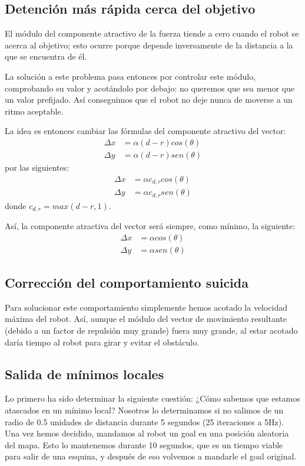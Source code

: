 \documentclass[a4paper, 11pt, titlepage]{article}
\begin{document}
  \subsection{Detención más rápida cerca del objetivo}
    El módulo del componente atractivo de la fuerza tiende a cero cuando el robot se acerca al objetivo; esto ocurre porque depende inversamente de la distancia a la que se encuentra de él.

    La solución a este problema pasa entonces por controlar este módulo, comprobando su valor y acotándolo por debajo: no queremos que sea menor que un valor prefijado. Así conseguimos que el robot no deje nunca de moverse a un ritmo aceptable.

    La idea es entonces cambiar las fórmulas del componente atractivo del vector:
    \begin{align*}
        \Delta x &= \alpha (d-r) cos(\theta) \\
        \Delta y &= \alpha (d-r) sen(\theta)
    \end{align*}
    por las siguientes:
    \begin{align*}
        \Delta x &= \alpha c_{d,r} cos(\theta) \\
        \Delta y &= \alpha c_{d,r} sen(\theta)
    \end{align*}
    donde $c_{d,r} = max(d-r, 1)$.

    Así, la componente atractiva del vector será siempre, como mínimo, la siguiente:
    \begin{align*}
        \Delta x &= \alpha cos(\theta) \\
        \Delta y &= \alpha sen(\theta)
    \end{align*}


  \subsection{Corrección del comportamiento suicida}
    Para solucionar este comportamiento simplemente hemos acotado la velocidad máxima del robot. Así, aunque el módulo del vector de movimiento resultante (debido a un factor de repulsión muy grande) fuera muy grande, al estar acotado daría tiempo al robot para girar y evitar el obstáculo.

  \subsection{Salida de mínimos locales}
    Lo primero ha sido determinar la siguiente cuestión: ¿Cómo sabemos que estamos atascados en un mínimo local? Nosotros lo determinamos si no salimos de un radio de 0.5 unidades de distancia durante 5 segundos (25 iteraciones a 5Hz). Una vez hemos decidido, mandamos al robot un goal en una posición aleatoria del mapa. Esto lo mantenemos durante 10 segundos, que es un tiempo viable para salir de una esquina, y después de eso volvemos a mandarle el goal original.
\end{document}
